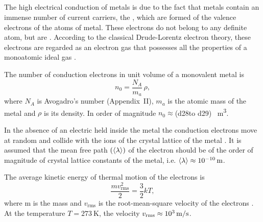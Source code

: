 \subsection{}\label{20.3.1} The high electrical conduction of metals is due to the fact that metals contain an immense number of current carriers, the , which are formed of the valence electrons  of the atoms of metal. These electrons do not belong to any definite atom, but are . According to the classical Drude-Lorentz electron theory, these electrons are regarded as an electron gas  that possesses all the properties of a monoatomic ideal gas .

The number of conduction electrons in unit volume of a monovalent metal is
\begin{equation*}%
n_{0} = \frac{N_{A}}{m_{a}} \, \rho,
\end{equation*}
where $N_{A}$ is Avogadro's number (Appendix~II), $m_{a}$ is the atomic mass of the metal and $\rho$ is its density. In order of magnitude $n_{0} \approx $(\num{d28}to \num{d29}) \si{\per\meter\cubed}.

In the absence of an electric held inside the metal the conduction electrons move at random and collide with the ions of the crystal lattice of the metal . It is assumed that the mean free path $(\expval{\lambda})$ of the electron  should be of the order of magnitude of crystal lattice constants of the metal, i.e. $\expval{\lambda} \approx \SI{d-10}{\meter}$.

The average kinetic energy of thermal motion of the electrons  is
\begin{equation*}%
\frac{mv^{2}_{\text{rms}}}{2} = \frac{3}{2} kT,
\end{equation*}	
where m is the mass and $v_{\text{rms}}$ is the root-mean-square velocity of the electrons . At the temperature $T = \SI{273}{\kelvin}$, the velocity $v_{\text{rms}} \approx \SI{d3}{\meter\per\second}$.

